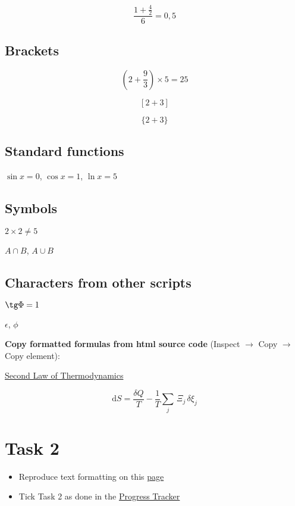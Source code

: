 \documentclass[a4paper,11pt]{article}
\begin{document}
\[\frac{1+\frac{4}{2}}{6} = 0,5\]

\subsection{Brackets}

\[ \left(2+\frac{9}{3}\right) \times 5 = 25 \]

\[  [2+3]  \]

\[ \{2+3\}  \]

\subsection{Standard functions}

$\sin x = 0$, $\cos x = 1$, $\ln x = 5$

\subsection{Symbols}

$2\times 2 \ne 5$

$A \cap B$, $A \cup B$

\subsection{Characters from other scripts}

$\tg \Phi = 1$

$\epsilon$, $\phi$

\bigskip


\textbf{{\color{red}Copy formatted formulas from html source code}} (Inspect $\rightarrow$ Copy $\rightarrow$ Copy element):

 \href{https://en.wikipedia.org/wiki/Second_law_of_thermodynamics}{Second Law of Thermodynamics}
 
\[\mathrm {d} S={\frac {\delta Q}{T}}-{\frac {1}{T}}\sum _{j}\,\Xi _{j}\,\delta \xi _{j}\]



\section*{Task 2}
\label{task}

\begin{tcolorbox}[width=\textwidth, colback={yellow!40!white}, title={}, colbacktitle=yellow!60!white, coltitle=black]
	\begin{itemize}
		\item Reproduce text formatting on this \href{https://github.com/kunilovskaya/dskills_workshop/blob/main/w1_latex_basics/s2/practice2.pdf}{page}
		\item Tick Task 2 as done in the \href{}{Progress Tracker}
	\end{itemize}
	
\end{tcolorbox}%
\end{document}
